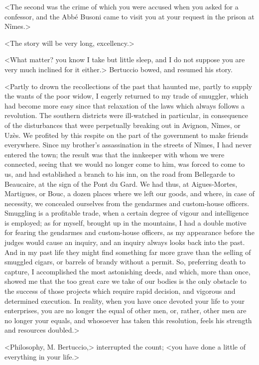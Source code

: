  <The second was the crime of which you were accused when you asked for a confessor, and the Abbé Busoni came to visit you at your request in the prison at Nîmes.> 

 <The story will be very long, excellency.> 

 <What matter? you know I take but little sleep, and I do not suppose you are very much inclined for it either.> Bertuccio bowed, and resumed his story. 

 <Partly to drown the recollections of the past that haunted me, partly to supply the wants of the poor widow, I eagerly returned to my trade of smuggler, which had become more easy since that relaxation of the laws which always follows a revolution. The southern districts were ill-watched in particular, in consequence of the disturbances that were perpetually breaking out in Avignon, Nîmes, or Uzès. We profited by this respite on the part of the government to make friends everywhere. Since my brother's assassination in the streets of Nîmes, I had never entered the town; the result was that the innkeeper with whom we were connected, seeing that we would no longer come to him, was forced to come to us, and had established a branch to his inn, on the road from Bellegarde to Beaucaire, at the sign of the Pont du Gard. We had thus, at Aigues-Mortes, Martigues, or Bouc, a dozen places where we left our goods, and where, in case of necessity, we concealed ourselves from the gendarmes and custom-house officers. Smuggling is a profitable trade, when a certain degree of vigour and intelligence is employed; as for myself, brought up in the mountains, I had a double motive for fearing the gendarmes and custom-house officers, as my appearance before the judges would cause an inquiry, and an inquiry always looks back into the past. And in my past life they might find something far more grave than the selling of smuggled cigars, or barrels of brandy without a permit. So, preferring death to capture, I accomplished the most astonishing deeds, and which, more than once, showed me that the too great care we take of our bodies is the only obstacle to the success of those projects which require rapid decision, and vigorous and determined execution. In reality, when you have once devoted your life to your enterprises, you are no longer the equal of other men, or, rather, other men are no longer your equals, and whosoever has taken this resolution, feels his strength and resources doubled.> 

 <Philosophy, M. Bertuccio,> interrupted the count; <you have done a little of everything in your life.> 

